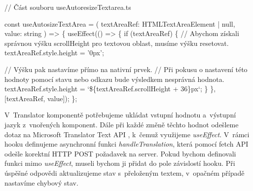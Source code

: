 \begin{prog}
// Část souboru useAutoresizeTextarea.ts

const useAutosizeTextArea = (
  textAreaRef: HTMLTextAreaElement | null, value: string
) => \{
  useEffect(() => \{
    if (textAreaRef) \{
      // Abychom získali správnou výšku scrollHeight 
        pro textovou oblast, musíme výšku resetovat.
      textAreaRef.style.height = '0px';

      // Výšku pak nastavíme přímo na nativní prvek.
      // Při pokusu o nastavení této hodnoty pomocí stavu 
        nebo odkazu bude výsledkem nesprávná hodnota.
      textAreaRef.style.height = `\$\{textAreaRef.scrollHeight + 36\}px`;
    \}
  \}, [textAreaRef, value]);
\};
\end{prog}

V~Translator komponentě potřebujeme ukládat vstupní hodnotu a~výstupní jazyk z~vnořených komponent. 
Dále při každé změně těchto hodnot odešleme dotaz na Microsoft Translator Text API \cite{translatortextapi}, k~čemuž využijeme \emph{useEffect}.
V~rámci hooku definujeme asynchronní funkci \emph{handleTranslation}, která pomocí fetch API odešle korektní HTTP POST požadavek na server. 
Pokud bychom definovali funkci mimo \emph{useEffect}, museli bychom ji přidat do pole závislostí hooku.
Při úspěšné odpovědi aktualizujeme stav s~přeloženým textem, v~opačném případě nastavíme chybový stav.

